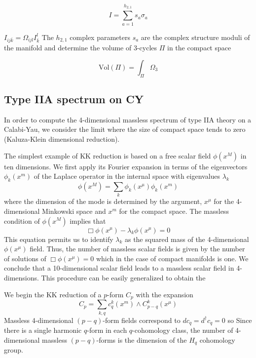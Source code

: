 \begin{equation}
I=\sum_{a=1}^{h_{2,1}}s_a \sigma_a
\end{equation}

$I_{ij\bar k}= \Omega_{ijl}I^l_{\bar k}$
The $h_{2,1}$ complex parameters $s_a$ are the complex structure moduli of the manifold
and determine the volume of 3-cycles $\Pi$ in the compact space

\begin{equation}
  \mathrm{Vol}(\Pi)=\int_\Pi \Omega_3
\end{equation}


\subsection{Type IIA spectrum on CY}
In order to compute the 4-dimensional massless spectrum of type IIA theory on a Calabi-Yau, we consider the 
limit where the size of compact space tends to zero (Kaluza-Klein dimensional reduction).

The simplest example of KK reduction is based on a free scalar field $\phi(x^M)$ in ten dimensions.
We first apply its Fourier expansion in terms of the eigenvectors $\phi_k(x^m)$ of the Laplace operator in the internal space  with eigenvalues $\lambda_k$
\begin{equation}
  \phi(x^M)= \sum_k \phi_k(x^\mu)\phi_k(x^m)
\end{equation}
where the dimension of the mode is determined by the argument, $x^\mu$ for the 4-dimensional Minkowski space and $x^m$ for the compact space.
The massless condition of $\phi(x^M)$ implies that
\begin{equation}
 \Box \phi(x^\mu) - \lambda_k \phi(x^\mu)=0 
\end{equation}
This equation permits us to identify $\lambda_k$  as the squared mass of the 4-dimensional $\phi(x^\mu)$ field.
Thus, the number of massless scalar fields is given by the number of solutions of $\Box \phi(x^\mu)=0$ which in the
case of compact manifolds is one.
We conclude that a 10-dimensional scalar field leads to a massless scalar field in 4-dimensions.
This procedure can be easily generalized to obtain the 

We begin the KK reduction of a $p$-form $C_p$ with the expansion 
\begin{equation}
  C_p=\sum_{k,q} c_q^k(x^m)\wedge C^k_{p-q}(x^\mu)
\end{equation}
Massless 4-dimensional $(p-q)$-form fields correspond to $dc_q=d^\dagger c_q=0$ so 
Since there is a single harmonic $q$-form in each $q$-cohomology class, 
the number of 4-dimensional massless $(p-q)$-forms is the dimension of the $H_q$ cohomology group.

